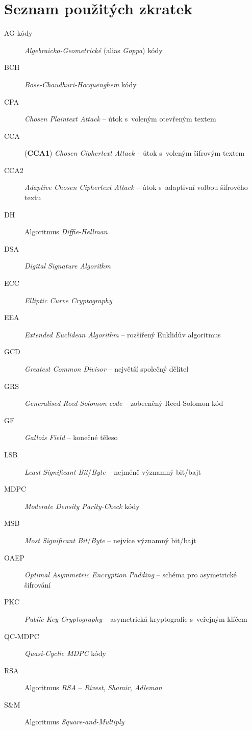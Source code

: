 \documentclass[thesis=M,czech,hidelinks]{FITthesis}[2012/06/26]
\newcommand{\0}{{\textcolor[gray]{0.75}{0}}}
\begin{document}
\chapter{Seznam použitých zkratek}
\begin{description}
    \item[AG-kódy]  \emph{Algebraicko-Geometrické} (alias \emph{Goppa}) kódy
    \item[BCH]      \emph{Bose-Chaudhuri-Hocquenghem} kódy
    \item[CPA]      \emph{Chosen Plaintext Attack} -- útok s~voleným otevřeným textem
    \item[CCA]      (\textbf{CCA1}) \emph{Chosen Ciphertext Attack} -- útok s~voleným šifrovým textem
    \item[CCA2]     \emph{Adaptive Chosen Ciphertext Attack} -- útok s~adaptivní volbou šifrového textu
    \item[DH]       Algoritmus \emph{Diffie-Hellman}
    \item[DSA]      \emph{Digital Signature Algorithm}
    \item[ECC]      \emph{Elliptic Curve Cryptography}
    \item[EEA]      \emph{Extended Euclidean Algorithm} -- rozšířený Euklidův algoritmus
    \item[GCD]      \emph{Greatest Common Divisor} -- největší společný dělitel
    \item[GRS]      \emph{Generalised Reed-Solomon code} -- zobecněný Reed-Solomon kód
    \item[GF]       \emph{Gallois Field} -- konečné těleso
    \item[LSB]      \emph{Least Significant Bit}/\emph{Byte} -- nejméně významný bit/bajt
    \item[MDPC]     \emph{Moderate Density Parity-Check} kódy
    \item[MSB]      \emph{Most Significant Bit}/\emph{Byte} -- nejvíce významný bit/bajt
    \item[OAEP]     \emph{Optimal Asymmetric Encryption Padding} -- schéma pro asymetrické šifrování
    \item[PKC]      \emph{Public-Key Cryptography} -- asymetrická kryptografie s~veřejným klíčem
    \item[QC-MDPC]  \emph{Quasi-Cyclic MDPC} kódy
    \item[RSA]      Algoritmus \emph{RSA} -- \emph{Rivest}, \emph{Shamir}, \emph{Adleman}
    \item[S\&M]     Algoritmus \emph{Square-and-Multiply}
\end{description}
\end{document}
